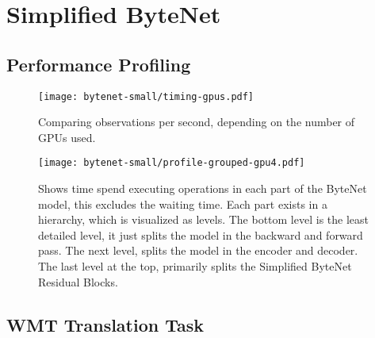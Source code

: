 \section{Simplified ByteNet}

\subsection{Performance Profiling}


\begin{figure}[h]
    \centering
    \texttt{[image: bytenet-small/timing-gpus.pdf]}
    \caption{Comparing observations per second, depending on the number of GPUs used.}
    \label{fig:result:bytenet:timing-gpus}
\end{figure}

\begin{figure}[h]
    \centering
    \texttt{[image: bytenet-small/profile-grouped-gpu4.pdf]}
    \caption{Shows time spend executing operations in each part of the ByteNet model, this excludes the waiting time. Each part exists in a hierarchy, which is visualized as levels. The bottom level is the least detailed level, it just splits the model in the backward and forward pass. The next level, splits the model in the encoder and decoder. The last level at the top, primarily splits the Simplified ByteNet Residual Blocks.}
    \label{fig:result:bytenet:profile-raw}
\end{figure}

\subsection{WMT Translation Task}


